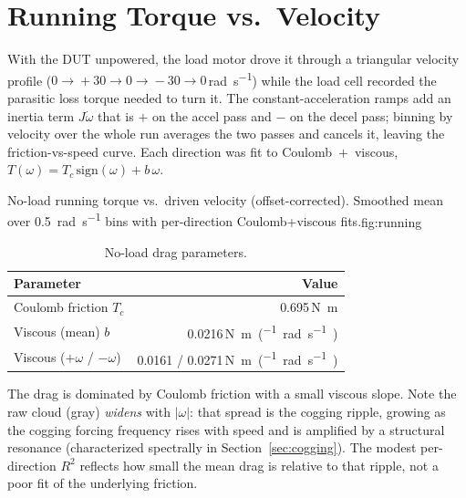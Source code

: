 \documentclass[11pt]{article}
\begin{document}
\section{Running Torque vs.\ Velocity}\label{sec:running}
With the DUT unpowered, the load motor drove it through a triangular velocity
profile ($0\!\to\!+30\!\to\!0\!\to\!-30\!\to\!0$\,\si{\radian\per\second}) while
the load cell recorded the parasitic loss torque needed to turn it. The
constant-acceleration ramps add an inertia term $J\dot\omega$ that is $+$ on the
accel pass and $-$ on the decel pass; binning by velocity over the whole run
averages the two passes and cancels it, leaving the friction-vs-speed curve. Each
direction was fit to Coulomb~$+$~viscous, $T(\omega)=T_c\,\mathrm{sign}(\omega)+b\,\omega$.

  {No-load running torque vs.\ driven velocity (offset-corrected). Smoothed mean
   over \SI{0.5}{\radian\per\second} bins with per-direction Coulomb+viscous fits.}{fig:running}

\begin{table}[H]
  \centering
  \caption{No-load drag parameters.}
  \begin{tabular}{lr}
    \toprule
    Parameter & Value\\
    \midrule
    Coulomb friction $T_c$        & \num{0.695}\,\si{\newton\meter}\\
    Viscous (mean) $b$            & \num{0.0216}\,\si{\newton\meter\per(\radian\per\second)}\\
    Viscous ($+\omega$ / $-\omega$) & \num{0.0161} / \num{0.0271}\,\si{\newton\meter\per(\radian\per\second)}\\
    \bottomrule
  \end{tabular}
\end{table}

The drag is dominated by Coulomb friction with a small viscous slope. Note the
raw cloud (gray) \emph{widens} with $|\omega|$: that spread is the cogging ripple,
growing as the cogging forcing frequency rises with speed and is amplified by a
structural resonance (characterized spectrally in Section~\ref{sec:cogging}). The
modest per-direction $R^2$ reflects how small the mean drag is relative to that
ripple, not a poor fit of the underlying friction.
\end{document}
